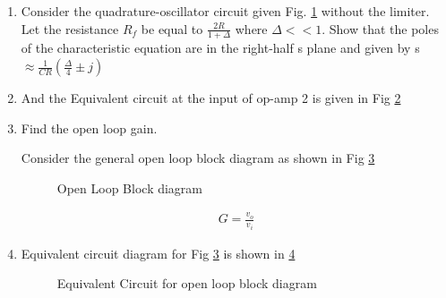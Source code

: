 \begin{enumerate}[label=\arabic*.,ref=\theenumi]
\item
Consider the quadrature-oscillator circuit given Fig. \ref{fig:es17btech11009_fig1} without the limiter. Let the resistance $R_{f}$ be equal to $\frac{2R}{1 + \Delta}$ where $\Delta << 1$. Show that the poles of the characteristic equation are in the right-half s plane and given by 
s $\approx \frac{1}{CR}(\frac{\Delta}{4}\pm j)$
\renewcommand{\thefigure}{\theenumi.\arabic{figure}}
\begin{figure}[!ht]
	\begin{center}
		\resizebox{\columnwidth}{!}{}
	\end{center}
\caption{}
\label{fig:es17btech11009_fig1}
\end{figure}
\item
And the Equivalent circuit at the input of op-amp 2 is given in Fig \ref{fig:es17btech11009_fig2}
\renewcommand{\thefigure}{\theenumi.\arabic{figure}}
\begin{figure}[!ht]
	\begin{center}
		\resizebox{\columnwidth}{!}{}
	\end{center}
\caption{}
\label{fig:es17btech11009_fig2}
\end{figure}
\item 
\solution Find the open loop gain.

Consider the general open loop block diagram as shown in Fig \ref{fig:es17btech11009_block1}
\renewcommand{\thefigure}{\theenumi.\arabic{figure}}
\begin{figure}[!ht]
	\begin{center}
		\resizebox{\columnwidth}{!}{}
	\end{center}
\caption{Open Loop Block diagram}
\label{fig:es17btech11009_block1}
\end{figure}
\begin{align}
    G = \frac{v_{o}}{v_i} 
\end{align}
\item
Equivalent circuit diagram for Fig \ref{fig:es17btech11009_block1} is shown in \ref{fig:es17btech11009_block2}
\renewcommand{\thefigure}{\theenumi.\arabic{figure}}
\begin{figure}[!ht]
	\begin{center}
		\resizebox{\columnwidth}{!}{}
	\end{center}
\caption{Equivalent Circuit for open loop block diagram}
\label{fig:es17btech11009_block2}
\end{figure}


\end{enumerate}
